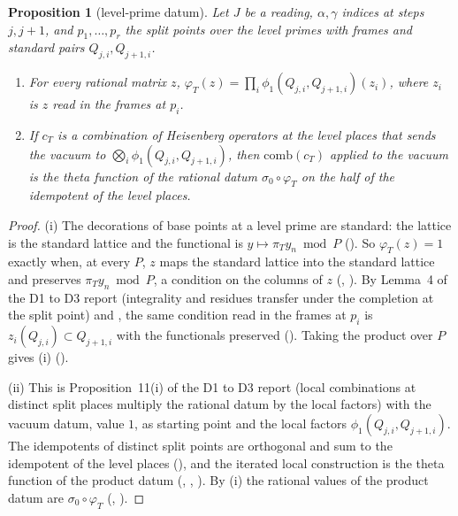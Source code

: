 \documentclass[11pt]{article}
\newtheorem{proposition}[theorem]{Proposition}
\theoremstyle{definition}
\theoremstyle{remark}
\begin{document}
\begin{proposition}[level-prime datum]\label{prop:L1}
Let $J$ be a reading, $\alpha,\gamma$ indices at steps $j,j+1$, and $p_1,\dots,p_r$ the split points over the level primes with frames and standard pairs $Q_{j,i},Q_{j+1,i}$.
\begin{enumerate}[label=(\roman*),itemsep=1pt]
\item For every rational matrix $z$, $\varphi_T(z)=\prod_i\phi_1(Q_{j,i},Q_{j+1,i})(z_i)$, where $z_i$ is $z$ read in the frames at $p_i$.
\item If $c_T$ is a combination of Heisenberg operators at the level places that sends the vacuum to $\bigotimes_i\phi_1(Q_{j,i},Q_{j+1,i})$, then $\mathrm{comb}(c_T)$ applied to the vacuum is the theta function of the rational datum $\sigma_0\circ\varphi_T$ on the half of the idempotent of the level places.
\end{enumerate}
\end{proposition}

\begin{proof}
(i) The decorations of base points at a level prime are standard: the lattice is the standard lattice and the functional is $y\mapsto\pi_Ty_n\bmod P$ (). So $\varphi_T(z)=1$ exactly when, at every $P$, $z$ maps the standard lattice into the standard lattice and preserves $\pi_Ty_n\bmod P$, a condition on the columns of $z$ (, ). By Lemma~4 of the D1 to D3 report (integrality and residues transfer under the completion at the split point) and , the same condition read in the frames at $p_i$ is $z_i(Q_{j,i})\subset Q_{j+1,i}$ with the functionals preserved (). Taking the product over $P$ gives (i) ().

(ii) This is Proposition~11(i) of the D1 to D3 report (local combinations at distinct split places multiply the rational datum by the local factors) with the vacuum datum, value $1$, as starting point and the local factors $\phi_1(Q_{j,i},Q_{j+1,i})$. The idempotents of distinct split points are orthogonal and sum to the idempotent of the level places (), and the iterated local construction is the theta function of the product datum (, , ). By (i) the rational values of the product datum are $\sigma_0\circ\varphi_T$ (, ).
\end{proof}
\end{document}
